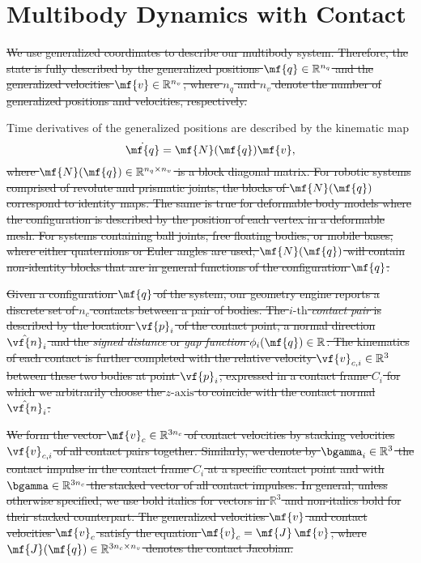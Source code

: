 \section{Multibody Dynamics with Contact}
\label{sec:multibody_dynamics_with_contact}

\sout{We use generalized coordinates to describe our multibody system. Therefore, the
state is fully described by the generalized positions
$\mf{q}\in\mathbb{R}^{n_q}$ and the generalized velocities
$\mf{v}\in\mathbb{R}^{n_v}$, where $n_q$ and $n_v$ denote the number of
generalized positions and velocities, respectively.}

Time derivatives of the generalized positions are described by the kinematic map
\begin{equation}
	\dot{\mf{q}} = \mf{N}(\mf{q})\mf{v},
	\label{eq:kinematic_map}
\end{equation}
\sout{where $\mf{N}(\mf{q})\in\mathbb{R}^{n_q\times n_v}$ is a block diagonal matrix.
For robotic systems comprised of revolute and prismatic joints, the blocks of
$\mf{N}(\mf{q})$ correspond to identity maps. The same is true for deformable
body models where the configuration is described by the position of each vertex
in a deformable mesh. For systems containing ball joints, free floating bodies,
or mobile bases, where either quaternions or Euler angles are used,
$\mf{N}(\mf{q})$ will contain non-identity blocks that are in general functions
of the configuration $\mf{q}$.}

\sout{Given a configuration $\mf{q}$ of the system, our geometry engine reports a
discrete set of $n_c$ contacts between a pair of bodies. The $i\text{-th}$
\emph{contact pair} is described by the location $\vf{p}_i$ of the contact
point, a normal direction $\hat{\vf{n}}_i$ and the \emph{signed distance} or
\emph{gap function} $\phi_i(\mf{q})\in\mathbb{R}$. The kinematics of each contact is further completed with
the relative velocity $\vf{v}_{c,i}\in\mathbb{R}^3$ between these two bodies at
point $\vf{p}_i$, expressed in a contact frame $C_i$ for which we arbitrarily
choose the $z\text{-axis}$ to coincide with the contact normal
$\hat{\vf{n}}_i$.}

\sout{We form the vector $\mf{v}_{c}\in\mathbb{R}^{3n_c}$ of contact velocities by
stacking velocities $\vf{v}_{c,i}$ of all contact pairs together. Similarly, we
denote by $\bgamma_i\in\mathbb{R}^3$ the contact impulse in the contact frame
$C_i$ at a specific contact point and with $\bgamma\in\mathbb{R}^{3n_c}$ the
stacked vector of all contact impulses. In general, unless otherwise specified,
we use bold italics for vectors in $\mathbb{R}^3$ and non-italics bold for their
stacked counterpart. The generalized velocities $\mf{v}$ and contact velocities
$\mf{v}_c$ satisfy the equation $\mf{v}_c=\mf{J}\,\mf{v}$, where
$\mf{J}(\mf{q})\in\mathbb{R}^{3n_c\times n_v}$ denotes the contact Jacobian.}

